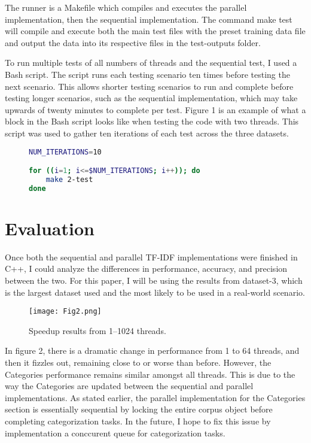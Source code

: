 \documentclass[conference]{IEEEtran}
\begin{document}
The runner is a Makefile which compiles and executes the parallel implementation, then the sequential implementation. The command make test will compile and execute both the main test files with the preset training data file and output the data into its respective files in the test-outputs folder.

To run multiple tests of all numbers of threads and the sequential test, I used a Bash script. The script runs each testing scenario ten times before testing the next scenario. This allows shorter testing scenarios to run and complete before testing longer scenarios, such as the sequential implementation, which may take upwards of twenty minutes to complete per test. Figure 1 is an example of what a block in the Bash script looks like when testing the code with two threads. This script was used to gather ten iterations of each test across the three datasets.

\begin{figure}[htbp]
\centering    
\begin{minipage}{0.95\linewidth}
\begin{lstlisting}[style=ieeecpp, language=bash]
NUM_ITERATIONS=10

for ((i=1; i<=$NUM_ITERATIONS; i++)); do
    make 2-test
done
\end{lstlisting}
\end{minipage}
\end{figure}

\section{Evaluation} \label{sec:evaluation}
Once both the sequential and parallel TF-IDF implementations were finished in C++, I could analyze the differences in performance, accuracy, and precision between the two. For this paper, I will be using the results from dataset-3, which is the largest dataset used and the most likely to be used in a real-world scenario.

\begin{figure}[htbp]
\centerline{\texttt{[image: Fig2.png]}}
\caption{Speedup results from 1--1024 threads.}
\label{fig}
\end{figure}

In figure 2, there is a dramatic change in performance from 1 to 64 threads, and then it fizzles out, remaining close to or worse than before. However, the Categories performance remains similar amongst all threads. This is due to the way the Categories are updated between the sequential and parallel implementations. As stated earlier, the parallel implementation for the Categories section is essentially sequential by locking the entire corpus object before completing categorization tasks. In the future, I hope to fix this issue by implementation a conccurent queue for categorization tasks.
\end{document}

